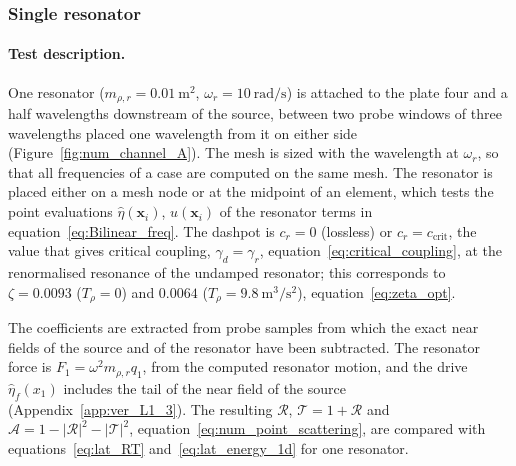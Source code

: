 {\subsubsection{Single resonator}\label{subsubsec:num_L1_3}

\paragraph{Test description.} One resonator ($m_{\rho,r}=0.01~\si{\meter\squared}$, $\omega_r=10~\si{\radian\per\second}$) is attached to the plate four and a half wavelengths downstream of the source, between two probe windows of three wavelengths placed one wavelength from it on either side (Figure~\ref{fig:num_channel_A}). The mesh is sized with the wavelength at $\omega_r$, so that all frequencies of a case are computed on the same mesh. The resonator is placed either on a mesh node or at the midpoint of an element, which tests the point evaluations $\widehat{\eta}(\mathbf{x}_i)$, $u(\mathbf{x}_i)$ of the resonator terms in equation~\eqref{eq:Bilinear_freq}. The dashpot is $c_r=0$ (lossless) or $c_r=c_\mathrm{crit}$, the value that gives critical coupling, $\gamma_d=\gamma_r$, equation~\eqref{eq:critical_coupling}, at the renormalised resonance of the undamped resonator; this corresponds to $\zeta=0.0093$ ($T_\rho=0$) and $0.0064$ ($T_\rho=9.8~\si{\meter\cubed\per\second\squared}$), equation~\eqref{eq:zeta_opt}.

The coefficients are extracted from probe samples from which the exact near fields of the source and of the resonator have been subtracted. The resonator force is $F_1=\omega^2m_{\rho,r}q_1$, from the computed resonator motion, and the drive $\widehat{\eta}_f(x_1)$ includes the tail of the near field of the source (Appendix~\ref{app:ver_L1_3}). The resulting $\mathcal{R}$, $\mathcal{T}=1+\mathcal{R}$ and $\mathcal{A}=1-|\mathcal{R}|^2-|\mathcal{T}|^2$, equation~\eqref{eq:num_point_scattering}, are compared with equations~\eqref{eq:lat_RT} and~\eqref{eq:lat_energy_1d} for one resonator.

}
